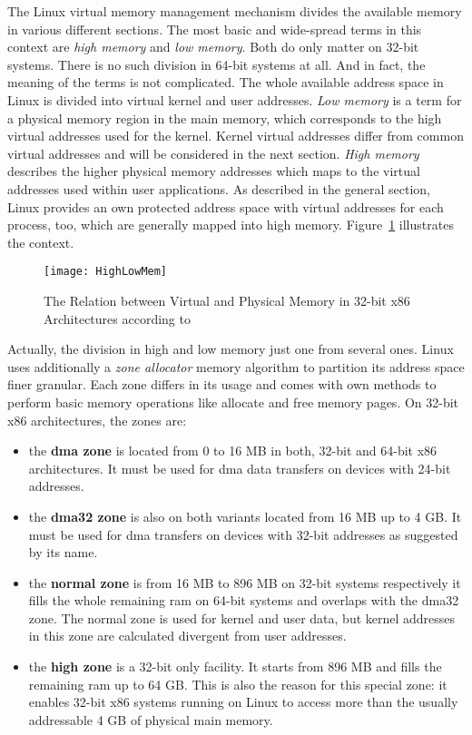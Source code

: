 The Linux virtual memory management mechanism divides the available memory in various different sections.
The most basic and wide-spread terms in this context are \textit{high memory} and \textit{low memory}.
Both do only matter on 32-bit systems.
There is no such division in 64-bit systems at all.
And in fact, the meaning of the terms is not complicated.
The whole available address space in Linux is divided into virtual kernel and user addresses.
\textit{Low memory} is a term for a physical memory region in the main memory, which corresponds to the high virtual addresses used for the kernel. 
Kernel virtual addresses differ from common virtual addresses and will be considered in the next section.
\textit{High memory} describes the higher physical memory addresses which maps to the virtual addresses used within user applications.
As described in the general section, Linux provides an own protected address space with virtual addresses for each process, too, which are generally mapped into high memory\cite{lfd430}.
Figure~\ref{pic:high-low-mem} illustrates the context.

\begin{figure} [t]
	\centering
	\texttt{[image: HighLowMem]}
	\caption{The Relation between Virtual and Physical Memory in 32-bit x86 Architectures according to~\cite{lfd430}}\label{pic:high-low-mem}
\end{figure}
%
Actually, the division in high and low memory just one from several ones. 
Linux uses additionally a \textit{zone allocator} memory algorithm to partition its address space finer granular.
Each zone differs in its usage and comes with own methods to perform basic memory operations like allocate and free memory pages\cite{lfd430}.
On 32-bit x86 architectures, the zones are:
\begin{itemize}
    \item the \textbf{\ac{dma} zone} is located from 0 to 16 MB in both, 32-bit and 64-bit x86 architectures. It must be used for \ac{dma} data transfers on devices with 24-bit addresses.
    \item the \textbf{\ac{dma}32 zone} is also on both variants located from 16 MB up to 4 GB\@. It must be used for \ac{dma} transfers on devices with 32-bit addresses as suggested by its name.
    \item the \textbf{normal zone} is from 16 MB to 896 MB on 32-bit systems respectively it fills the whole remaining \ac{ram} on 64-bit systems and overlaps with the \ac{dma}32 zone. The normal zone is used for kernel and user data, but kernel addresses in this zone are calculated divergent from user addresses.
    \item the \textbf{high zone} is a 32-bit only facility. It starts from 896 MB and fills the remaining \ac{ram} up to 64 GB\@. This is also the reason for this special zone: it enables 32-bit x86 systems running on Linux to access more than the usually addressable 4 GB of physical main memory\cite{lfd430}.
\end{itemize}

